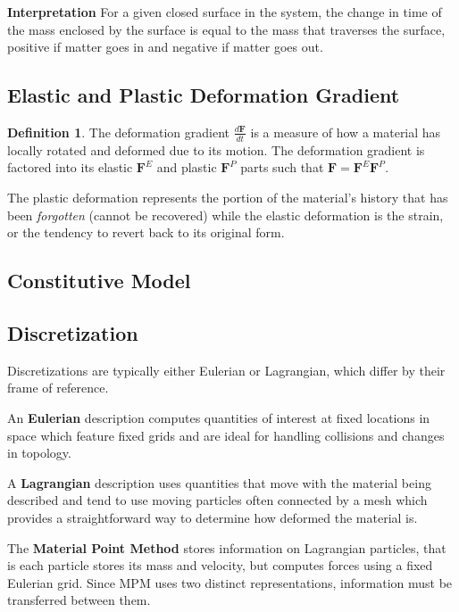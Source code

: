 \documentclass{scrartcl}
\theoremstyle{definition}
\newtheorem{definition}{Definition}
\begin{document}
\noindent\textbf{Interpretation}
For a given closed surface in the system, the change in time of the mass enclosed by the surface is equal to the mass that traverses the surface, positive if matter goes in and negative if matter goes out. 

\subsection{Elastic and Plastic Deformation Gradient}
\begin{definition}
	The deformation gradient $\frac{d\textbf{F}}{dt}$ is a measure of how a material has locally rotated and deformed due to its motion. The deformation gradient is factored into its elastic $\textbf{F}^E$ and plastic $\textbf{F}^P$ parts such that $\textbf{F} = \textbf{F}^E\textbf{F}^P$.
\end{definition}
The plastic deformation represents the portion of the material's history that has been \textit{forgotten} (cannot be recovered) while the elastic deformation is the strain, or the tendency to revert back to its original form.

\subsection{Constitutive Model}

\subsection{Discretization}
Discretizations are typically either Eulerian or Lagrangian, which differ by their frame of reference.

An \textbf{Eulerian} description computes quantities of interest at fixed locations in space which feature fixed grids and are ideal for handling collisions and changes in topology.

A \textbf{Lagrangian} description uses quantities that move with the material being described and tend to use moving particles often connected by a mesh which provides a straightforward way to determine how deformed the material is.

The \textbf{Material Point Method} stores information on Lagrangian particles, that is each particle stores its mass and velocity, but computes forces using a fixed Eulerian grid. Since MPM uses two distinct representations, information must be transferred between them.
\end{document}
